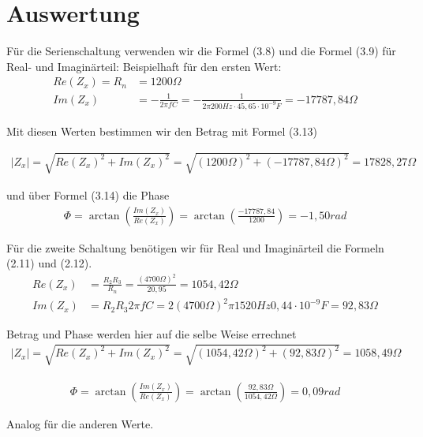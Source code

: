 \chapter{Auswertung}
    	Für die Serienschaltung verwenden wir die Formel (3.8) und die Formel (3.9)  für Real- und Imaginärteil:
        Beispielhaft für den ersten Wert:
        \begin{align}
        	Re(Z_x) = R_n &= 1200 \Omega  \\
            Im(Z_x) &= -\frac{1}{2\pi f C} = -\frac{1}{2\pi 200 Hz \cdot 45,65 \cdot 10^{-9} F} = -17787,84 \Omega
        \end{align}
    
    Mit diesen Werten bestimmen wir den Betrag mit Formel (3.13)
    
	\begin{align}
		\left| Z_x \right| = \sqrt{Re(Z_x)^2 + Im(Z_x)^2} =  \sqrt{(1200\Omega)^2 + (-17787,84\Omega)^2} = 17828,27 \Omega
	\end{align}
    
   und über Formel (3.14) die Phase
   \begin{align}
   		\Phi = \arctan\left(\frac{Im(Z_x)}{Re(Z_x)}\right) = \arctan\left(\frac{-17787,84}{1200}\right) = -1,50 rad
   \end{align}
    
    Für die zweite Schaltung benötigen wir für Real und Imaginärteil die Formeln (2.11) und (2.12).
    \begin{align}
        	Re(Z_x) &= \frac{R_2R_3}{R_n} = \frac{(4700\Omega)^2}{20,95} = 1054,42 \Omega \\
            Im(Z_x) &= R_2R_3 2\pi f C =  2(4700\Omega)^2 \pi 1520 Hz 0,44 \cdot 10^{-9} F = 92,83 \Omega
        \end{align}
    
    Betrag und Phase werden hier auf die selbe Weise errechnet
	\begin{align}
		\left| Z_x \right| = \sqrt{Re(Z_x)^2 + Im(Z_x)^2} = \sqrt{(1054,42\Omega)^2 + (92,83\Omega)^2} = 1058,49 \Omega
	\end{align}
  
   \begin{align}
   		\Phi = \arctan\left(\frac{Im(Z_x)}{Re(Z_x)}\right) = \arctan\left(\frac{92,83 \Omega }{1054,42 \Omega}\right) =  0,09 rad
   \end{align}
   
Analog für die anderen Werte.
    
